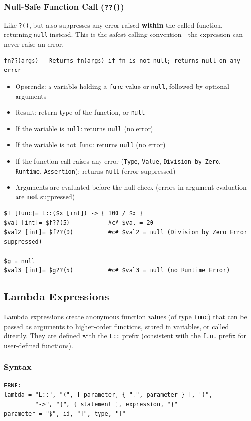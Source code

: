 \subsubsection{Null-Safe Function Call (\texttt{??()})}
Like \texttt{?()}, but also suppresses any error raised \textbf{within} the called function, returning \texttt{null} instead. This is the safest calling convention---the expression can never raise an error.
\begin{verbatim}
fn??(args)   Returns fn(args) if fn is not null; returns null on any error
\end{verbatim}
\begin{itemize}
\item Operands: a variable holding a \texttt{func} value or \texttt{null}, followed by optional arguments
\item Result: return type of the function, or \texttt{null}
\item If the variable is \texttt{null}: returns \texttt{null} (no error)
\item If the variable is not \texttt{func}: returns \texttt{null} (no error)
\item If the function call raises any error (\texttt{Type}, \texttt{Value}, \texttt{Division by Zero}, \texttt{Runtime}, \texttt{Assertion}): returns \texttt{null} (error suppressed)
\item Arguments are evaluated before the null check (errors in argument evaluation are \textbf{not} suppressed)
\end{itemize}
\begin{verbatim}
$f [func]= L::($x [int]) -> { 100 / $x }
$val [int]= $f??(5)           #c# $val = 20
$val2 [int]= $f??(0)          #c# $val2 = null (Division by Zero Error suppressed)

$g = null
$val3 [int]= $g??(5)          #c# $val3 = null (no Runtime Error)
\end{verbatim}

\label{sec:lambda}
\subsection{Lambda Expressions}
Lambda expressions create anonymous function values (of type \texttt{func}) that can be passed as arguments to higher-order functions, stored in variables, or called directly. They are defined with the \texttt{L::} prefix (consistent with the \texttt{f.u.} prefix for user-defined functions).

\subsubsection{Syntax}
\begin{verbatim}
EBNF:
lambda = "L::", "(", [ parameter, { ",", parameter } ], ")", 
         "->", "{", { statement }, expression, "}"
parameter = "$", id, "[", type, "]"
\end{verbatim}

